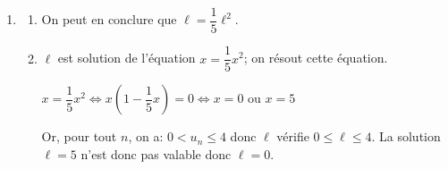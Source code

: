 \documentclass[10pt]{article}
\providecommand{\ds}{\displaystyle}
\begin{document}
\begin{enumerate}
\begin{enumerate}

On a donc démontré que pour tout entier naturel $n$, on a: $0 < u_n \leqslant 4$.

		\item 
$u_{n+1}-u_n = \dfrac{1}{5} u_n^2 - u_n = u_n \left (\dfrac{u_n}{5}-1\right )
= u_n \left (\dfrac{u_n-5}{5}\right )$		

$u_n\leqslant 4$ donc $u_n-5<0$; or $u_n>0$ donc $u_n\left (u_n-5\right )<0$ et donc $u_{n+1}-u_n<0$

On en conclut que la suite $(u_n)$ est décroissante.
		
		\item 
Pour tout $n$, $0<u_n$ donc la suite $(u_n)$ est minorée par 0.

La suite $(u_n)$ est décroissante et minorée donc, d'après le théorème de la convergence monotone, la suite $(u_n)$ est convergente.		
	\end{enumerate}
	
\item 
	\begin{enumerate}
		\item
{}		

On peut en conclure que $\ell = \dfrac{1}{5}\ell^2$.
		
		\item 
$\ell$ est solution de l'équation $x=\dfrac{1}{5}x^2$; on résout cette	équation.

$x=\dfrac{1}{5}x^2 \iff x\left (1-\dfrac{1}{5}x\right )=0
\iff x=0 \text{ ou } x=5$

Or, pour tout $n$, on a: $0<u_n\leqslant 4$ donc $\ell$ vérifie $0\leqslant \ell \leqslant 4$. La solution $\ell=5$ n'est donc pas valable donc $\ell=0$.
		

\end{enumerate}
\end{enumerate}
\end{document}
